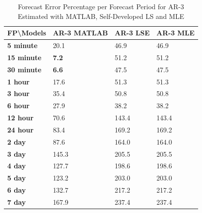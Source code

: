\documentclass[journal]{IEEEtran}
\begin{document}
\begin{table}[htpb]
  \centering
  \caption{Forecast Error Percentage per Forecast Period for AR-3 Estimated with MATLAB, Self-Developed LS and MLE}
\begin{tabular}{|l|l|l|l|}
\hline
\textbf{FP\textbackslash{}Models} & \textbf{AR-3 MATLAB} & \textbf{AR-3 LSE} & \textbf{AR-3 MLE} \\ \hline
\textbf{5 minute}                 & 20.1                 & 46.9              & 46.9              \\ \hline
\textbf{15 minute}                & \textbf{7.2}         & 51.2              & 51.2              \\ \hline
\textbf{30 minute}                & \textbf{6.6}         & 47.5              & 47.5              \\ \hline
\textbf{1 hour}                   & 17.6                 & 51.3              & 51.3              \\ \hline
\textbf{3 hour}                   & 35.4                 & 50.8              & 50.8              \\ \hline
\textbf{6 hour}                   & 27.9                 & 38.2              & 38.2              \\ \hline
\textbf{12 hour}                  & 70.6                 & 143.4             & 143.4             \\ \hline
\textbf{24 hour}                  & 83.4                 & 169.2             & 169.2             \\ \hline
\textbf{2 day}                    & 87.6                 & 164.0             & 164.0             \\ \hline
\textbf{3 day}                    & 145.3                & 205.5             & 205.5             \\ \hline
\textbf{4 day}                    & 127.7                & 198.6             & 198.6             \\ \hline
\textbf{5 day}                    & 123.2                & 203.0             & 203.0             \\ \hline
\textbf{6 day}                    & 132.7                & 217.2             & 217.2             \\ \hline
\textbf{7 day}                    & 167.9                & 237.4             & 237.4             \\ \hline
\end{tabular}
\label{tab7}
\end{table}
\end{document}

